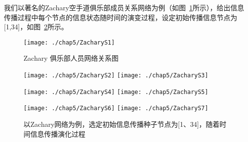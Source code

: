 
我们以著名的Zachary\cite{zachary1977information}空手道俱乐部成员关系网络为例（如图~\ref{fig:ZacharyS1}所示），给出信息传播过程中每个节点的信息状态随时间的演变过程，设定初始传播信息节点为[1,34]，如图~\ref{fig:chap05ZacharySpreading}所示。
\begin{figure}[H] %
	\centering
	\texttt{[image: ./chap5/ZacharyS1]}
	\caption{Zachary 俱乐部人员网络关系图}
	\label{fig:ZacharyS1}
\end{figure}
\begin{figure}[H]
\centering%
	{\texttt{[image: ./chap5/ZacharyS2]}}
	\hspace{1mm}%
	{\texttt{[image: ./chap5/ZacharyS3]}}
	
	{\texttt{[image: ./chap5/ZacharyS4]}}
	{\texttt{[image: ./chap5/ZacharyS5]}}
	
	{\texttt{[image: ./chap5/ZacharyS6]}}
	{\texttt{[image: ./chap5/ZacharyS7]}}
	\caption{以Zachary网络为例，选定初始信息传播种子节点为[1、34]，随着时间信息传播演化过程}
	\label{fig:chap05ZacharySpreading}
\end{figure}


